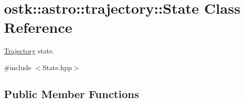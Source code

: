 \hypertarget{classostk_1_1astro_1_1trajectory_1_1_state}{}\section{ostk\+:\+:astro\+:\+:trajectory\+:\+:State Class Reference}
\label{classostk_1_1astro_1_1trajectory_1_1_state}


\hyperlink{classostk_1_1astro_1_1_trajectory}{Trajectory} state.  




{\ttfamily \#include $<$State.\+hpp$>$}

\subsection*{Public Member Functions}
